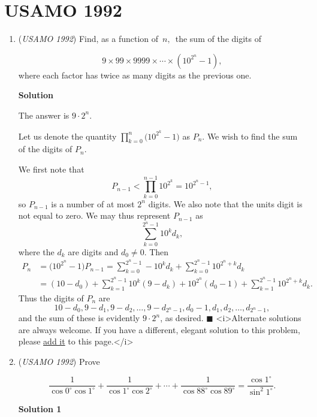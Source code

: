 \section{USAMO 1992}
        \begin{enumerate}
        	\item (\textit{USAMO 1992}) Find, as a function of $\, n, \,$ the sum of the digits of 

 \[9 \times 99 \times 9999 \times \cdots \times \left( 10^{2^n} - 1 \right),\] 
where each factor has twice as many digits as the previous one.


 



\textbf{Solution}

The answer is $9 \cdot 2^n$.

 Let us denote the quantity $\prod_{k=0}^n \bigl( 10^{2^k}-1 \bigr)$ as $P_n$.  We wish to find the sum of the digits of $P_n$.

 We first note that
 \[P_{n-1} < \prod_{k=0}^{n-1} 10^{2^k} = 10^{2^n-1},\]so $P_{n-1}$ is a number of at most $2^n$ digits.  We also note that the units digit is not equal to zero.  We may thus represent $P_{n-1}$ as
 \[\sum_{k=0}^{2^n-1} 10^k d_k ,\]where the $d_k$ are digits and $d_0 \neq 0$.  Then
 \begin{align*} P_n &= \bigl( 10^{2^n}-1 \bigr) P_{n-1} = \sum_{k=0}^{2^n-1} - 10^k d_k + \sum_{k=0}^{2^n-1} 10^{2^n+k} d_k \\ &= (10-d_0) + \sum_{k=1}^{2^n-1} 10^k(9-d_k) + 10^{2^n}(d_0-1) + \sum_{k=1}^{2^n-1} 10^{2^n+k} d_k . \end{align*}
Thus the digits of $P_n$ are
 \[10-d_0, 9-d_1, 9-d_2, \dotsc, 9-d_{2^n-1}, d_0-1, d_1, d_2, \dotsc, d_{2^n-1} ,\]and the sum of these is evidently $9 \cdot 2^n$, as desired.  $\blacksquare$
<i>Alternate solutions are always welcome. If you have a different, elegant solution to this problem, please \href{https://artofproblemsolving.com/wiki/index.php?title=1992\_USAMO\_Problems/Problem\_1&action=edit}{add it} to this page.</i>



	\item (\textit{USAMO 1992}) Prove 

 \[\frac{1}{\cos 0^\circ \cos 1^\circ} +  \frac{1}{\cos 1^\circ \cos 2^\circ} + \cdots + \frac{1}{\cos 88^\circ \cos 89^\circ} = \frac{\cos 1^\circ}{\sin^2 1^\circ}.\]




\textbf{Solution 1}


\end{enumerate}
